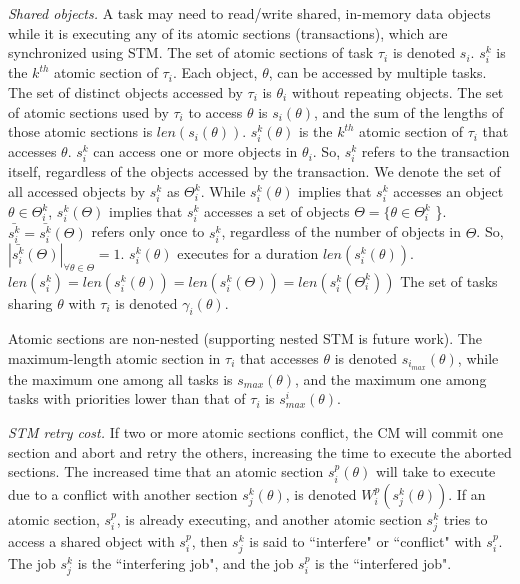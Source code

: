 \documentclass[prodmode,acmtecs]{acmsmall}
\begin{document}
\textit{Shared objects.}
 A task may need to read/write shared, in-memory data objects while it is executing any of its atomic sections (transactions), which are synchronized using STM. 
The set of atomic sections of task $\tau_i$ is denoted $s_i$. $s_i^k$ is the $k^{th}$ atomic section of $\tau_i$. 
Each object, $\theta$, can be accessed by multiple tasks. The set of distinct objects accessed by $\tau_i$ is $\theta_i$ without repeating objects.
The set of atomic sections used by $\tau_i$ to access $\theta$ is $s_i(\theta)$, and the sum of the lengths of those atomic sections is $len(s_i(\theta))$. $s_i^k(\theta)$ is the $k^{th}$ atomic section of $\tau_i$ that accesses $\theta$.
%
 $s_i^k$ can access one or more objects in $\theta_i$. So, $s_i^k$ refers to the transaction itself, regardless of the objects accessed by the transaction. We denote the set of all accessed objects by $s_i^k$ as $\Theta_i^k$. While $s_i^k(\theta)$ implies that $s_i^k$ accesses an object $\theta \in \Theta_i^k$, $s_i^k(\Theta)$ implies that $s_i^k$ accesses a set of objects $\Theta=\{\theta \in \Theta_i^k$ \}. $\bar{s_i^k}=\bar{s_i^k}(\Theta)$ refers only once to $s_i^k$, regardless of the number of objects in $\Theta$. So, $|\bar{s_i^k}(\Theta)|_{\forall \theta \in \Theta}=1$.
%
 $s_i^k(\theta)$  executes for a duration $len(s_i^k(\theta))$. $len(s_i^k)=len(s_i^k(\theta))=len(s_i^k(\Theta))=len(s_i^k(\Theta_i^k))$ The set of tasks sharing $\theta$ with $\tau_i$ is denoted $\gamma_i(\theta)$. 

Atomic sections are non-nested (supporting nested STM is future work). The maximum-length atomic section in $\tau_i$ that accesses $\theta$ is denoted $s_{i_{max}} (\theta)$, while the maximum one among all tasks is $s_{max} (\theta)$, and the maximum one among tasks with priorities lower than that of $\tau_i$ is $s_{max}^i (\theta)$.

\textit{STM retry cost.} If two or more atomic sections conflict, the CM will commit one section and abort and retry the others, increasing the time to execute the aborted sections. The increased time that an atomic section $s_i^p (\theta)$ will take to execute due to a conflict with another section $s_j^k (\theta)$, is denoted $W_{i}^{p}(s_{j}^{k}(\theta))$. If an atomic section, $s_i^p$, is already executing, and another atomic section $s_j^k$ tries to access a shared object with $s_i^p$, then $s_j^k$ is said to ``interfere" or ``conflict" with $s_i^p$. The job $s_j^k$ is the ``interfering job", and the job $s_i^p$ is the ``interfered job".
\end{document}
